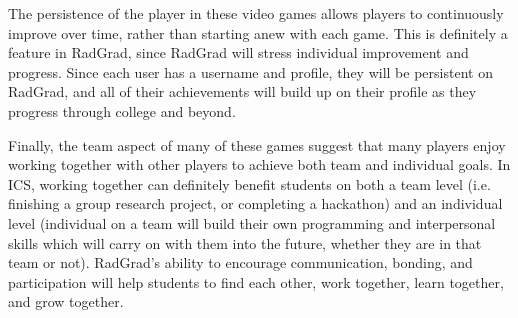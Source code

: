 The persistence of the player in these video games allows players to continuously improve over time, rather than starting anew with each game. This is definitely a feature in RadGrad, since RadGrad will stress individual improvement and progress. Since each user has a username and profile, they will be persistent on RadGrad, and all of their achievements will build up on their profile as they progress through college and beyond.

Finally, the team aspect of many of these games suggest that many players enjoy working together with other players to achieve both team and individual goals. In ICS, working together can definitely benefit students on both a team level (i.e. finishing a group research project, or completing a hackathon) and an individual level (individual on a team will build their own programming and interpersonal skills which will carry on with them into the future, whether they are in that team or not). RadGrad's ability to encourage communication, bonding, and participation will help students to find each other, work together, learn together, and grow together.